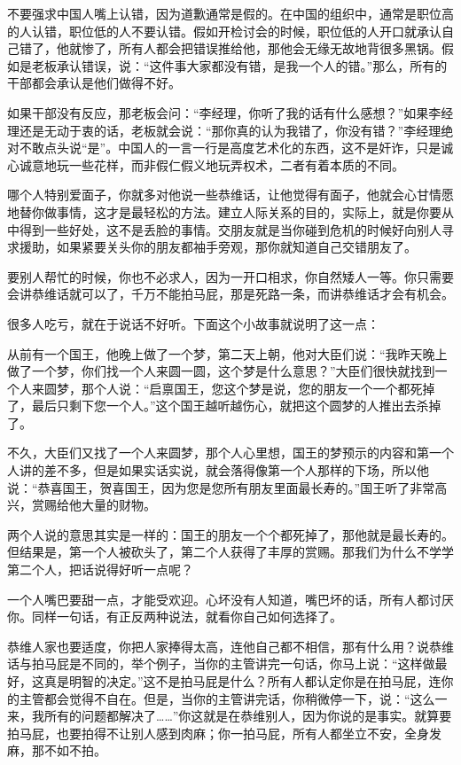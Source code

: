 \documentclass[fontset=fandol, a4paper, 12pt, openright]{ctexbook}
\begin{document}
不要强求中国人嘴上认错，因为道歉通常是假的。在中国的组织中，通常是职位高的人认错，职位低的人不要认错。假如开检讨会的时候，职位低的人开口就承认自己错了，他就惨了，所有人都会把错误推给他，那他会无缘无故地背很多黑锅。假如是老板承认错误，说：“这件事大家都没有错，是我一个人的错。”那么，所有的干部都会承认是他们做得不好。

如果干部没有反应，那老板会问：“李经理，你听了我的话有什么感想？”如果李经理还是无动于衷的话，老板就会说：“那你真的认为我错了，你没有错？”李经理绝对不敢点头说“是”。中国人的一言一行是高度艺术化的东西，这不是奸诈，只是诚心诚意地玩一些花样，而非假仁假义地玩弄权术，二者有着本质的不同。

哪个人特别爱面子，你就多对他说一些恭维话，让他觉得有面子，他就会心甘情愿地替你做事情，这才是最轻松的方法。建立人际关系的目的，实际上，就是你要从中得到一些好处，这不是丢脸的事情。交朋友就是当你碰到危机的时候好向别人寻求援助，如果紧要关头你的朋友都袖手旁观，那你就知道自己交错朋友了。

要别人帮忙的时候，你也不必求人，因为一开口相求，你自然矮人一等。你只需要会讲恭维话就可以了，千万不能拍马屁，那是死路一条，而讲恭维话才会有机会。

很多人吃亏，就在于说话不好听。下面这个小故事就说明了这一点：

从前有一个国王，他晚上做了一个梦，第二天上朝，他对大臣们说：“我昨天晚上做了一个梦，你们找一个人来圆一圆，这个梦是什么意思？”大臣们很快就找到一个人来圆梦，那个人说：“启禀国王，您这个梦是说，您的朋友一个一个都死掉了，最后只剩下您一个人。”这个国王越听越伤心，就把这个圆梦的人推出去杀掉了。

不久，大臣们又找了一个人来圆梦，那个人心里想，国王的梦预示的内容和第一个人讲的差不多，但是如果实话实说，就会落得像第一个人那样的下场，所以他说：“恭喜国王，贺喜国王，因为您是您所有朋友里面最长寿的。”国王听了非常高兴，赏赐给他大量的财物。

两个人说的意思其实是一样的：国王的朋友一个个都死掉了，那他就是最长寿的。但结果是，第一个人被砍头了，第二个人获得了丰厚的赏赐。那我们为什么不学学第二个人，把话说得好听一点呢？

一个人嘴巴要甜一点，才能受欢迎。心坏没有人知道，嘴巴坏的话，所有人都讨厌你。同样一句话，有正反两种说法，就看你自己如何选择了。

恭维人家也要适度，你把人家捧得太高，连他自己都不相信，那有什么用？说恭维话与拍马屁是不同的，举个例子，当你的主管讲完一句话，你马上说：“这样做最好，这真是明智的决定。”这不是拍马屁是什么？所有人都认定你是在拍马屁，连你的主管都会觉得不自在。但是，当你的主管讲完话，你稍微停一下，说：“这么一来，我所有的问题都解决了……”你这就是在恭维别人，因为你说的是事实。就算要拍马屁，也要拍得不让别人感到肉麻；你一拍马屁，所有人都坐立不安，全身发麻，那不如不拍。
\end{document}
